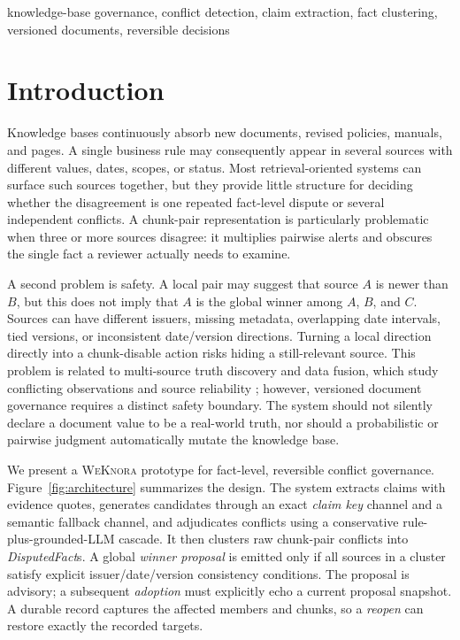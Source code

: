 \documentclass[conference]{IEEEtran}
\newcommand{\sys}{\textsc{WeKnora}}
\newcommand{\claimkey}{\textit{claim key}}
\newcommand{\disputedfact}{\textit{DisputedFact}}
\newcommand{\proposal}{\textit{winner proposal}}
\newcommand{\adoption}{\textit{adoption}}
\newcommand{\reopen}{\textit{reopen}}
\begin{document}
\begin{IEEEkeywords}
knowledge-base governance, conflict detection, claim extraction, fact clustering, versioned documents, reversible decisions
\end{IEEEkeywords}

\section{Introduction}
\label{sec:introduction}

Knowledge bases continuously absorb new documents, revised policies, manuals, and pages. A single business rule may consequently appear in several sources with different values, dates, scopes, or status. Most retrieval-oriented systems can surface such sources together, but they provide little structure for deciding whether the disagreement is one repeated fact-level dispute or several independent conflicts. A chunk-pair representation is particularly problematic when three or more sources disagree: it multiplies pairwise alerts and obscures the single fact a reviewer actually needs to examine.

A second problem is safety. A local pair may suggest that source $A$ is newer than $B$, but this does not imply that $A$ is the global winner among $A$, $B$, and $C$. Sources can have different issuers, missing metadata, overlapping date intervals, tied versions, or inconsistent date/version directions. Turning a local direction directly into a chunk-disable action risks hiding a still-relevant source. This problem is related to multi-source truth discovery and data fusion, which study conflicting observations and source reliability \cite{yin2008truth,li2016truthsurvey,dong2013datafusion,dong2014knowledgevault}; however, versioned document governance requires a distinct safety boundary. The system should not silently declare a document value to be a real-world truth, nor should a probabilistic or pairwise judgment automatically mutate the knowledge base.

We present a \sys{} prototype for fact-level, reversible conflict governance. Figure~\ref{fig:architecture} summarizes the design. The system extracts claims with evidence quotes, generates candidates through an exact \claimkey{} channel and a semantic fallback channel, and adjudicates conflicts using a conservative rule-plus-grounded-LLM cascade. It then clusters raw chunk-pair conflicts into \disputedfact{}s. A global \proposal{} is emitted only if all sources in a cluster satisfy explicit issuer/date/version consistency conditions. The proposal is advisory; a subsequent \adoption{} must explicitly echo a current proposal snapshot. A durable record captures the affected members and chunks, so a \reopen{} can restore exactly the recorded targets.
\end{document}
